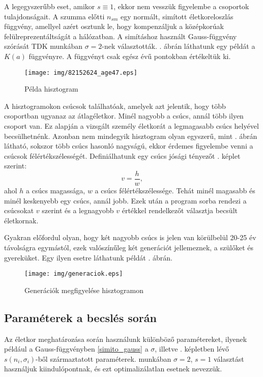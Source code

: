 \documentclass[12pt]{article}
\begin{document}
A legegyszerűbb eset, amikor $s\equiv 1$, ekkor nem vesszük figyelembe a csoportok tulajdonságait.
A szumma előtti $n_{sm}$ egy normált, simított életkoreloszlás függvény, amellyel azért osztunk le, hogy kompenzáljuk a középkorúak felülreprezentáltságát a hálózatban.
A simításhoz használt Gauss-függvény szórását  TDK munkában $\sigma=2$-nek választották. \iffalse TODO: ez lehet nem túl világos \fi {}. ábrán láthatunk egy példát a $K(a)$ függvényre. A függvényt csak egész évű pontokban értékeltük ki.
\begin{figure}[H]
	\centering
	\texttt{[image: img/82152624\_age47.eps]}
	\caption{Példa hisztogram} %
	\label{hisztogram_pelda}
\end{figure}
A hisztogramokon csúcsok találhatóak, amelyek azt jelentik, hogy több csoportban ugyanaz az átlagéletkor. Minél nagyobb a csúcs, annál több ilyen csoport van. Ez alapján a vizsgált személy életkorát a legmagasabb csúcs helyével becsülhetnénk. Azonban nem mindegyik hisztogram olyan egyszerű, mint . ábrán látható, sokszor több csúcs hasonló nagyságú, ekkor érdemes figyelembe venni a csúcsok félértékszélességét. Definiálhatunk egy csúcs jósági tényezőt . képlet szerint:
\begin{equation} \label{csucs_josag}
	v = \frac{h}{w},
\end{equation}
ahol $h$ a csúcs magassága, $w$ a csúcs félértékszélessége. Tehát minél magasabb és minél keskenyebb egy csúcs, annál jobb. Ezek után a program sorba rendezi a csúcsokat $v$ szerint és a legnagyobb $v$ értékkel rendelkezőt választja becsült életkornak.

Gyakran előfordul olyan, hogy két nagyobb csúcs is jelen van körülbelül 20-25 év távolságra egymástól, ezek valószínűleg két generációt jellemeznek, a szülőket és gyereküket. Egy ilyen esetre láthatunk példát . ábrán.
\begin{figure}[H]
	\centering
	\texttt{[image: img/generaciok.eps]}
	\caption{Generációk megfigyelése hisztogramon}
	\label{generaciok}
\end{figure}

\iffalse
Azt is meg kell említenünk, hogy a hisztogram simítása miatt a csúcs helye eltolódhat, ha a csúcs egyik oldalán sokkal több csoport van, mint a másikon.
\begin{figure}[H]
	\centering
	\texttt{[image: img/]}
\end{figure}
\fi
\subsection{Paraméterek a becslés során} \label{parameterek_subsection}
Az életkor meghatározása során használunk különböző paramétereket, ilyenek például a Gauss-függvényben \eqref{simito_gauss} a $\sigma$\iffalse TODO: na jó nem biztos, hogy így szép \fi, illetve . képletben lévő $s(n_i, \sigma_i)$-ből származtatott paraméterek.  munkában $\sigma=2$, $s=1$ választást használjuk kiindulópontnak, és
ezt optimalizálatlan esetnek nevezzük.
\end{document}
